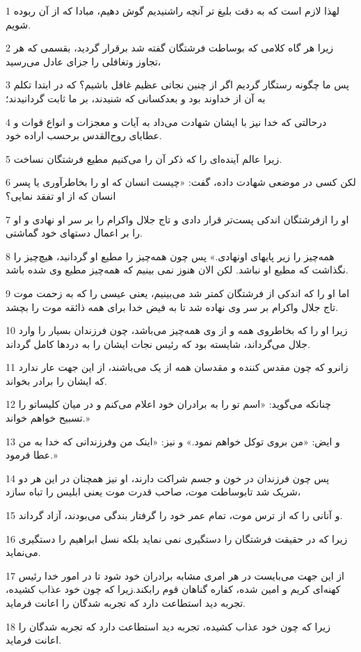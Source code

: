 \par 1 لهذا لازم است که به دقت بلیغ تر آنچه راشنیدیم گوش دهیم، مبادا که از آن ربوده شویم.
\par 2 زیرا هر گاه کلامی که بوساطت فرشتگان گفته شد برقرار گردید، بقسمی که هر تجاوز وتغافلی را جزای عادل می‌رسید،
\par 3 پس ما چگونه رستگار گردیم اگر از چنین نجاتی عظیم غافل باشیم؟ که در ابتدا تکلم به آن از خداوند بود و بعدکسانی که شنیدند، بر ما ثابت گردانیدند؛
\par 4 درحالتی که خدا نیز با ایشان شهادت می‌داد به آیات و معجزات و انواع قوات و عطایای روح‌القدس برحسب اراده خود.
\par 5 زیرا عالم آینده‌ای را که ذکر آن را می‌کنیم مطیع فرشتگان نساخت.
\par 6 لکن کسی در موضعی شهادت داده، گفت: «چیست انسان که او را بخاطرآوری یا پسر انسان که از او تفقد نمایی؟
\par 7 او را ازفرشتگان اندکی پست‌تر قرار دادی و تاج جلال واکرام را بر سر او نهادی و او را بر اعمال دستهای خود گماشتی.
\par 8 همه‌چیز را زیر پایهای اونهادی.» پس چون همه‌چیز را مطیع او گردانید، هیچ‌چیز را نگذاشت که مطیع او نباشد. لکن الان هنوز نمی بینیم که همه‌چیز مطیع وی شده باشد.
\par 9 اما او را که اندکی از فرشتگان کمتر شد می‌بینیم، یعنی عیسی را که به زحمت موت تاج جلال واکرام بر سر وی نهاده شد تا به فیض خدا برای همه ذائقه موت را بچشد.
\par 10 زیرا او را که بخاطروی همه و از وی همه‌چیز می‌باشد، چون فرزندان بسیار را وارد جلال می‌گرداند، شایسته بود که رئیس نجات ایشان را به دردها کامل گرداند.
\par 11 زانرو که چون مقدس کننده و مقدسان همه از یک می‌باشند، از این جهت عار ندارد که ایشان را برادر بخواند.
\par 12 چنانکه می‌گوید: «اسم تو را به برادران خود اعلام می‌کنم و در میان کلیساتو را تسبیح خواهم خواند.»
\par 13 و ایض: «من بروی توکل خواهم نمود.» و نیز: «اینک من وفرزندانی که خدا به من عطا فرمود.»
\par 14 پس چون فرزندان در خون و جسم شراکت دارند، او نیز همچنان در این هر دو شریک شد تابوساطت موت، صاحب قدرت موت یعنی ابلیس را تباه سازد،
\par 15 و آنانی را که از ترس موت، تمام عمر خود را گرفتار بندگی می‌بودند، آزاد گرداند.
\par 16 زیرا که در حقیقت فرشتگان را دستگیری نمی نماید بلکه نسل ابراهیم را دستگیری می‌نماید.
\par 17 از این جهت می‌بایست در هر امری مشابه برادران خود شود تا در امور خدا رئیس کهنه‌ای کریم و امین شده، کفاره گناهان قوم رابکند.زیرا که چون خود عذاب کشیده، تجربه دید استطاعت دارد که تجربه شدگان را اعانت فرماید.
\par 18 زیرا که چون خود عذاب کشیده، تجربه دید استطاعت دارد که تجربه شدگان را اعانت فرماید.

